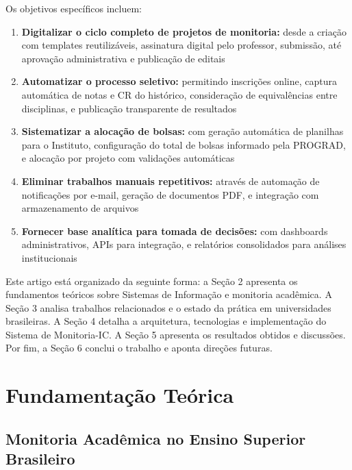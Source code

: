 \documentclass[portuguese]{sbc2025}%
\begin{document}
Os objetivos específicos incluem:

\begin{enumerate}
  \item \textbf{Digitalizar o ciclo completo de projetos de monitoria:} desde a criação com templates reutilizáveis, assinatura digital pelo professor, submissão, até aprovação administrativa e publicação de editais

  \item \textbf{Automatizar o processo seletivo:} permitindo inscrições online, captura automática de notas e CR do histórico, consideração de equivalências entre disciplinas, e publicação transparente de resultados

  \item \textbf{Sistematizar a alocação de bolsas:} com geração automática de planilhas para o Instituto, configuração do total de bolsas informado pela PROGRAD, e alocação por projeto com validações automáticas

  \item \textbf{Eliminar trabalhos manuais repetitivos:} através de automação de notificações por e-mail, geração de documentos PDF, e integração com armazenamento de arquivos

  \item \textbf{Fornecer base analítica para tomada de decisões:} com dashboards administrativos, APIs para integração, e relatórios consolidados para análises institucionais
\end{enumerate}

Este artigo está organizado da seguinte forma: a Seção 2 apresenta os fundamentos teóricos sobre Sistemas de Informação e monitoria acadêmica. A Seção 3 analisa trabalhos relacionados e o estado da prática em universidades brasileiras. A Seção 4 detalha a arquitetura, tecnologias e implementação do Sistema de Monitoria-IC. A Seção 5 apresenta os resultados obtidos e discussões. Por fim, a Seção 6 conclui o trabalho e aponta direções futuras.

\section{Fundamentação Teórica}
\label{sec:background}

\subsection{Monitoria Acadêmica no Ensino Superior Brasileiro}
\end{document}
